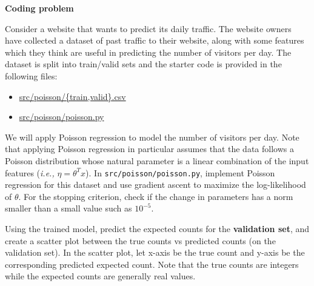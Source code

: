 \item {} \textbf{Coding problem}

Consider a website that wants to predict its
daily traffic. The website owners have collected a dataset of past traffic to
their website, along with some features which they think are useful in
predicting the number of visitors per day. The dataset is split into
train/valid sets and the starter code is provided in the following files:
\begin{center}
\begin{itemize}
\item 	\url{src/poisson/{train,valid}.csv}
\item   \url{src/poisson/poisson.py}
\end{itemize}
\end{center}
We will apply Poisson regression to model the number of visitors per day.
Note that applying Poisson regression in particular assumes that the data
follows a Poisson distribution whose natural parameter is a linear
combination of the input features (\emph{i.e.,} $\eta = \theta^T x$).
In \texttt{src/poisson/poisson.py}, implement Poisson regression for this dataset
and use gradient ascent to maximize the log-likelihood of $\theta$. For the
stopping criterion, check if the change in parameters has a norm smaller than
a small value such as $10^{-5}$.

Using the trained model, predict the expected counts for the \textbf{validation set}, and
create a scatter plot between the true counts vs predicted counts (on the
validation set). In the scatter plot, let x-axis be the true count and y-axis
be the corresponding predicted expected count. Note that the true counts
are integers while the expected counts are generally real values.
